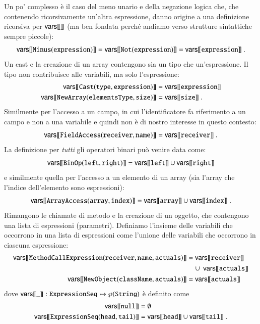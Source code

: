 Un po' \piu complesso \`e il caso del meno unario e della negazione logica che,
che contenendo ricorsivamente un'altra espressione, danno origine a una
definizione ricorsiva per ${\mathsf{vars}[\![{}]\!]}$ (ma ben fondata perch\'e andiamo verso
strutture sintattiche sempre \piu piccole):
\[
  {\mathsf{vars}[\![{\mathtt{Minus(expression)}}]\!]}={\mathsf{vars}[\![{\mathtt{Not(expression)}}]\!]}
    ={\mathsf{vars}[\![{\mathtt{expression}}]\!]}~.
\]
Un cast e la creazione di un array contengono sia un tipo che un'espressione.
Il tipo non contribuisce alle variabili, ma solo l'espressione:
%
\begin{align*}
  \vars{\mathtt{Cast(type,expression)}}&=\vars{\mathtt{expression}}\\
  \vars{\mathtt{NewArray(elementsType,size)}}&=\vars{\mathtt{size}}~.
\end{align*}
%
Similmente per l'accesso a un campo, in cui l'identificatore fa riferimento
a un campo e non a una variabile e quindi non \`e di nostro interesse in questo
contesto:
%
\begin{equation}\label{eq:vars_fieldaccess}
  {\mathsf{vars}[\![{\mathtt{FieldAccess(receiver,name)}}]\!]}={\mathsf{vars}[\![{\mathtt{receiver}}]\!]}~.
\end{equation}
%
La definizione per \emph{tutti} gli operatori binari pu\`o venire data come:
\begin{equation}\label{eq:vars_binop}
  {\mathsf{vars}[\![{\mathtt{BinOp(left,right)}}]\!]}={\mathsf{vars}[\![{\mathtt{left}}]\!]}\cup
    {\mathsf{vars}[\![{\mathtt{right}}]\!]}
\end{equation}
%
e similmente quella per l'accesso a un elemento di un array (sia l'array che
l'indice dell'elemento sono espressioni):
\[
  {\mathsf{vars}[\![{\mathtt{ArrayAccess(array,index)}}]\!]}={\mathsf{vars}[\![{\mathtt{array}}]\!]}\cup
    {\mathsf{vars}[\![{\mathtt{index}}]\!]}~.
\]
%
Rimangono le chiamate di metodo e la creazione di un oggetto, che contengono
una lista di espressioni (parametri). Definiamo
l'insieme delle variabili che occorrono in una lista di espressioni come
l'unione delle variabili che occorrono in ciascuna espressione:
%
\begin{align*}
  \vars{\mathtt{MethodCallExpression(receiver,name,actuals)}}
    &=\vars{\mathtt{receiver}}\\
  &\quad\cup\ \vars{\mathtt{actuals}}\\
  \vars{\mathtt{NewObject(className,actuals)}}&=\vars{\mathtt{actuals}}
\end{align*}
%
dove ${\mathsf{vars}[\![{\_}]\!]}:\mathtt{ExpressionSeq}\mapsto\wp(\mathtt{String})$ \`e
definito come
%
\begin{align*}
  \vars{\mathtt{null}}&=\emptyset\\
  \vars{\mathtt{ExpressionSeq(head,tail)}}&=\vars{\mathtt{head}}\cup
    \vars{\mathtt{tail}}~.
\end{align*}

